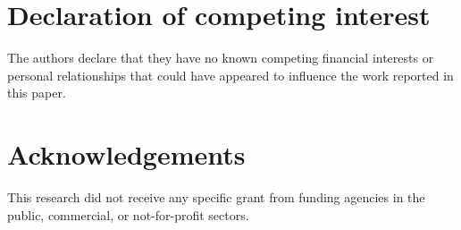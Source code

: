 \documentclass[a4paper,fleqn]{cas-sc}
\begin{document}
\printcredits

\section*{Declaration of competing interest}
The authors declare that they have no known competing financial interests or personal relationships that could have appeared to influence the work reported in this paper.

\section*{Acknowledgements}
This research did not receive any specific grant from funding agencies in the public, commercial, or not-for-profit sectors.

\end{document}
